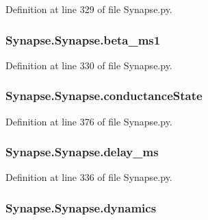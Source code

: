 Definition at line 329 of file Synapse.\+py.

\subsubsection[{\texorpdfstring{beta\+\_\+ms1}{beta_ms1}}]{\setlength{\rightskip}{0pt plus 5cm}Synapse.\+Synapse.\+beta\+\_\+ms1}\hypertarget{class_synapse_1_1_synapse_ab59f413cbd21555531be209dee307a97}{}\label{class_synapse_1_1_synapse_ab59f413cbd21555531be209dee307a97}


Definition at line 330 of file Synapse.\+py.

\subsubsection[{\texorpdfstring{conductance\+State}{conductanceState}}]{\setlength{\rightskip}{0pt plus 5cm}Synapse.\+Synapse.\+conductance\+State}\hypertarget{class_synapse_1_1_synapse_a89d3762daa9c60be63403a5ce9fd9a84}{}\label{class_synapse_1_1_synapse_a89d3762daa9c60be63403a5ce9fd9a84}


Definition at line 376 of file Synapse.\+py.

\subsubsection[{\texorpdfstring{delay\+\_\+ms}{delay_ms}}]{\setlength{\rightskip}{0pt plus 5cm}Synapse.\+Synapse.\+delay\+\_\+ms}\hypertarget{class_synapse_1_1_synapse_a14adfda48133bd314f4dcd65fc9a2366}{}\label{class_synapse_1_1_synapse_a14adfda48133bd314f4dcd65fc9a2366}


Definition at line 336 of file Synapse.\+py.

\subsubsection[{\texorpdfstring{dynamics}{dynamics}}]{\setlength{\rightskip}{0pt plus 5cm}Synapse.\+Synapse.\+dynamics}\hypertarget{class_synapse_1_1_synapse_a67a1454de1ef2f08ffa3a10bf8466158}{}\label{class_synapse_1_1_synapse_a67a1454de1ef2f08ffa3a10bf8466158}


